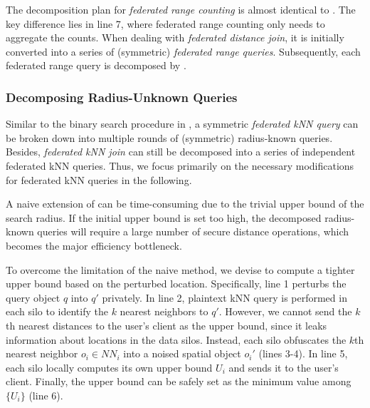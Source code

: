 The decomposition plan for \textit{federated range counting} is almost identical to . 
The key difference lies in line 7, where federated range counting only needs to aggregate the counts.
When dealing with \textit{federated distance join}, it is initially converted into a series of (symmetric) \textit{federated range queries}. 
Subsequently, each federated range query is decomposed by .

\subsubsection{Decomposing Radius-Unknown Queries}\label{sec:symmetric-urad}

Similar to the binary search procedure in , a symmetric \textit{federated kNN query} can be broken down into multiple rounds of (symmetric) radius-known queries.
Besides, \textit{federated kNN join} can still be decomposed into a series of independent federated kNN queries.
Thus, we focus primarily on the necessary modifications for federated kNN queries in the following.

A naive extension of  can be time-consuming due to the trivial upper bound of the search radius.
If the initial upper bound is set too high, the decomposed radius-known queries will require a large number of secure distance operations, which becomes the major efficiency bottleneck.

To overcome the limitation of the naive method, we devise  to compute a tighter upper bound based on the perturbed location. 
Specifically, line 1 perturbs the query object $q$ into $q'$ privately.
In line 2, plaintext kNN query is performed in each silo to identify the $k$ nearest neighbors to $q'$.
However, we cannot send the $k$th nearest distances to the user's client as the upper bound, since it leaks information about locations in the data silos.
Instead, each silo obfuscates the $k$th nearest neighbor $o_i \in NN_i$ into a noised spatial object $o_i'$ (lines 3-4).
In line 5, each silo locally computes its own upper bound $U_i$ and sends it to the user's client.
Finally, the upper bound can be safely set as the minimum value among $\{U_i\}$ (line 6).


